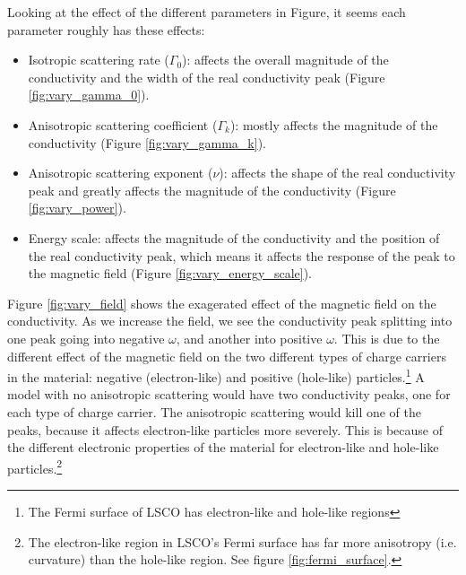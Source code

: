 Looking at the effect of the different parameters in Figure, it seems each parameter roughly has
these effects:
\begin{itemize}
    \item Isotropic scattering rate ($\Gamma_0$): affects the overall magnitude of the conductivity
        and the width of the real conductivity peak (Figure \ref{fig:vary_gamma_0}).
    \item Anisotropic scattering coefficient ($\Gamma_k$): mostly affects the magnitude of the
        conductivity (Figure \ref{fig:vary_gamma_k}).
    \item Anisotropic scattering exponent ($\nu$): affects the shape of the real conductivity peak
        and greatly affects the magnitude of the conductivity (Figure \ref{fig:vary_power}).
    \item Energy scale: affects the magnitude of the conductivity and the position of the real
        conductivity peak, which means it affects the response of the peak to the magnetic field
        (Figure \ref{fig:vary_energy_scale}).
\end{itemize}

Figure \ref{fig:vary_field} shows the exagerated effect of the magnetic field on the conductivity.
As we increase the field, we see the conductivity peak splitting into one peak going into negative
$\omega$, and another into positive $\omega$. This is due to the different effect of the magnetic
field on the two different types of charge carriers in the material: negative (electron-like)
and positive (hole-like) particles.\footnote{The Fermi surface of LSCO has electron-like
and hole-like regions} A model with no anisotropic scattering would have two conductivity peaks,
one for each type of charge carrier. The anisotropic scattering would kill one of the peaks,
because it affects electron-like particles more severely. This is because of the different
electronic properties of the material for electron-like and hole-like particles.\footnote{
The electron-like region in LSCO's Fermi surface has far more anisotropy (i.e. curvature)
than the hole-like region. See figure \ref{fig:fermi_surface}.}


